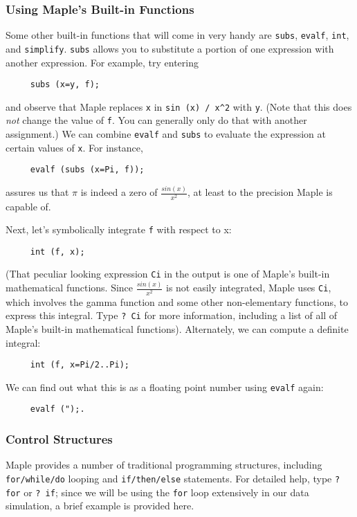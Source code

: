 \documentclass[11pt]{article}
\begin{document}
\subsubsection{Using Maple's Built-in Functions}

Some other built-in functions that will come in very handy are
\verb|subs|, \verb|evalf|, \verb|int|, and \verb|simplify|.
\verb|subs| allows you to substitute a portion of one expression 
with another expression.  For example, try entering
\begin{verbatim}
     subs (x=y, f);
\end{verbatim}
and observe that Maple replaces \verb|x| in \verb|sin (x) / x^2| with \verb|y|.
(Note that this does {\em not} change the value of \verb|f|.  You can
generally only do that with another assignment.)  We can combine
\verb|evalf| and \verb|subs| to evaluate the expression at certain
values of \verb|x|.  For instance, 
\begin{verbatim}
     evalf (subs (x=Pi, f));
\end{verbatim}
assures us that $\pi$ is indeed a zero of $\frac{sin(x)}{x^{2}}$, at
least to the precision Maple is capable of. 

Next, let's symbolically integrate \verb|f| with respect to x:
\begin{verbatim}
     int (f, x);
\end{verbatim}
(That peculiar looking expression \verb|Ci| in the output is one of
Maple's built-in mathematical functions.  Since $\frac{sin(x)}{x^{2}}$
is not easily integrated, Maple uses \verb|Ci|, which involves the
gamma function and some other non-elementary functions, to express
this integral.  Type \verb|? Ci| for more information, including a
list of all of Maple's built-in mathematical functions).  Alternately,
we can compute a definite integral:
\begin{verbatim}
     int (f, x=Pi/2..Pi);
\end{verbatim}
We can find out what this is as a floating point number using
\verb|evalf| again:
\begin{verbatim}
     evalf (");.
\end{verbatim}

\subsubsection{Control Structures}

Maple provides a number of traditional programming structures,
including \verb|for/while/do| looping and \verb|if/then/else|
statements.  For detailed help, type \verb|? for| or \verb|? if|;
since we will be using the \verb|for| loop extensively in our data
simulation, a brief example is provided here.
\end{document}
